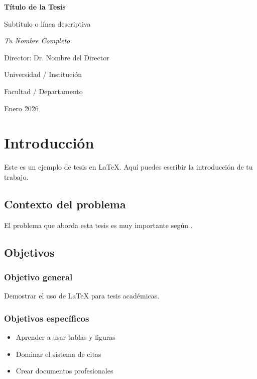 \documentclass[12pt, a4paper]{report}
\begin{document}
\begin{titlepage}
    \centering
    \vspace*{2cm}
    {\Huge\bfseries Título de la Tesis\par}
    \vspace{1.5cm}
    {\Large Subtítulo o línea descriptiva\par}
    \vspace{2cm}
    {\large\itshape Tu Nombre Completo\par}
    \vspace{1cm}
    {\large Director: Dr. Nombre del Director\par}
    \vfill
    {\large Universidad / Institución\par}
    {\large Facultad / Departamento\par}
    \vspace{1cm}
    {\large Enero 2026\par}
\end{titlepage}

\tableofcontents          %
\listoffigures            %
\listoftables             %
\newpage

\chapter{Introducción}
\label{cap:introduccion}

Este es un ejemplo de tesis en \LaTeX. Aquí puedes escribir la introducción de tu trabajo.

\section{Contexto del problema}
El problema que aborda esta tesis es muy importante según \textcite{knuth1984}.

\section{Objetivos}
\subsection{Objetivo general}
Demostrar el uso de \LaTeX{} para tesis académicas.

\subsection{Objetivos específicos}
\begin{itemize}
    \item Aprender a usar tablas y figuras
    \item Dominar el sistema de citas
    \item Crear documentos profesionales
\end{itemize}
\end{document}
